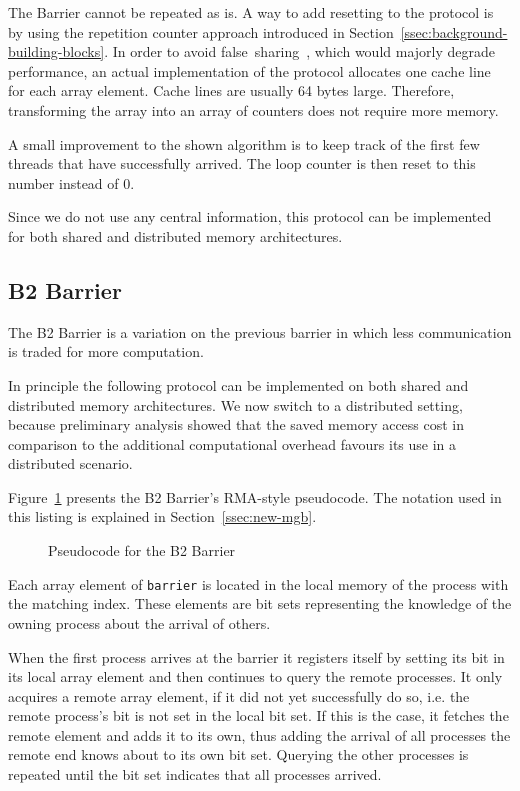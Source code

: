 \documentclass[a4paper, 10pt]{article}
\begin{document}
The Barrier cannot be repeated as is. A way to add resetting to the protocol is by using the repetition counter approach introduced in Section~\ref{ssec:background-building-blocks}. In order to avoid false~sharing~\cite{falsesharing}, which would majorly degrade performance, an actual implementation of the protocol allocates one cache line for each array element. Cache lines are usually 64 bytes large. Therefore, transforming the array into an array of counters does not require more memory.

A small improvement to the shown algorithm is to keep track of the first few threads that have successfully arrived. The loop counter is then reset to this number instead of 0.

Since we do not use any central information, this protocol can be implemented for both shared and distributed memory architectures.

\subsection{B2 Barrier}
\label{ssec:new-b2}
The B2 Barrier is a variation on the previous barrier in which less communication is traded for more computation.

In principle the following protocol can be implemented on both shared and distributed memory architectures. We now switch to a distributed setting, because preliminary analysis showed that the saved memory access cost in comparison to the additional computational overhead favours its use in a distributed scenario.

Figure~\ref{fig:pseudocode-b2} presents the B2 Barrier's RMA-style pseudocode. The notation used in this listing is explained in Section~\ref{ssec:new-mgb}.
\begin{figure}[htbp]
	\centering
	
	\caption{Pseudocode for the B2 Barrier}
	\label{fig:pseudocode-b2}
\end{figure}
Each array element of \texttt{barrier} is located in the local memory of the process with the matching index. These elements are bit sets representing the knowledge of the owning process about the arrival of others.

When the first process arrives at the barrier it registers itself by setting its bit in its local array element and then continues to query the remote processes. It only acquires a remote array element, if it did not yet successfully do so, i.e. the remote process's bit is not set in the local bit set. If this is the case, it fetches the remote element and adds it to its own, thus adding the arrival of all processes the remote end knows about to its own bit set. Querying the other processes is repeated until the bit set indicates that all processes arrived.
\end{document}
